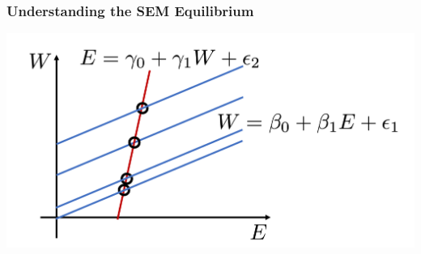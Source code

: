 \documentclass[12pt, block=fill]{beamer}
\begin{document}
\begin{frame}
  \frametitle{Understanding the SEM Equilibrium}
   \includegraphics[width =\textwidth]{images/reverse_3}  
\end{frame}





  

\end{document}
